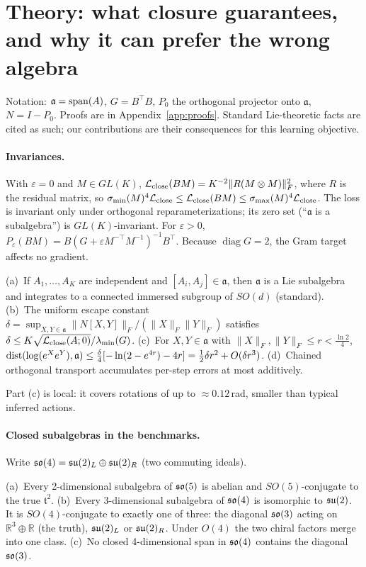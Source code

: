 \section{Theory: what closure guarantees, and why it can prefer the wrong algebra}\label{sec:theory}
Notation: $\mathfrak a=\operatorname{span}(A)$, $G=B^\top B$, $P_0$ the orthogonal projector onto $\mathfrak a$, $N=I-P_0$.
Proofs are in Appendix~\ref{app:proofs}. Standard Lie-theoretic facts are cited as such; our contributions are
their consequences for this learning objective.

\paragraph{Invariances.}
With $\varepsilon{=}0$ and $M\in GL(K)$, $\mathcal{L}_{\mathrm{close}}(BM)=K^{-2}\|R(M\otimes M)\|_F^2$, where $R$ is the residual matrix,
so $\sigma_{\min}(M)^4\mathcal{L}_{\mathrm{close}}\le\mathcal{L}_{\mathrm{close}}(BM)\le\sigma_{\max}(M)^4\mathcal{L}_{\mathrm{close}}$. The loss is invariant only under orthogonal
reparameterizations; its zero set (``$\mathfrak a$ is a subalgebra'') is $GL(K)$-invariant. For $\varepsilon>0$,
$P_\varepsilon(BM)=B(G+\varepsilon M^{-\top}M^{-1})^{-1}B^\top$. Because $\operatorname{diag}G=2$, the Gram target
affects no gradient.

\begin{proposition}\label{prop:basic}
(a)~If $A_1,\dots,A_K$ are independent and $[A_i,A_j]\in\mathfrak a$, then $\mathfrak a$ is a Lie subalgebra and
integrates to a connected immersed subgroup of $SO(d)$ (standard).
(b)~The uniform escape constant
$\delta=\sup_{X,Y\in\mathfrak a}\|N[X,Y]\|_F/(\|X\|_F\|Y\|_F)$ satisfies
$\delta\le K\sqrt{\mathcal{L}_{\mathrm{close}}(A;0)}/\lambda_{\min}(G)$.
(c)~For $X,Y\in\mathfrak a$ with $\|X\|_F,\|Y\|_F\le r<\frac{\ln2}{4}$,
$\operatorname{dist}(\log(e^Xe^Y),\mathfrak a)\le\frac{\delta}{4}[-\ln(2-e^{4r})-4r]=\tfrac12\delta r^2+O(\delta r^3)$.
(d)~Chained orthogonal transport accumulates per-step errors at most additively.
\end{proposition}

Part (c) is local: it covers rotations of up to $\approx0.12$\,rad, smaller than typical inferred actions.

\paragraph{Closed subalgebras in the benchmarks.}
Write $\mathfrak{so}(4)=\mathfrak{su}(2)_L\oplus\mathfrak{su}(2)_R$ (two commuting ideals).

\begin{proposition}\label{prop:classify}
(a)~Every 2-dimensional subalgebra of $\mathfrak{so}(5)$ is abelian and $SO(5)$-conjugate to the true $\mathfrak t^2$.
(b)~Every 3-dimensional subalgebra of $\mathfrak{so}(4)$ is isomorphic to $\mathfrak{su}(2)$. It is $SO(4)$-conjugate to exactly one
of three: the diagonal $\mathfrak{so}(3)$ acting on $\mathbb R^3\oplus\mathbb R$ (the truth), $\mathfrak{su}(2)_L$ or $\mathfrak{su}(2)_R$.
Under $O(4)$ the two chiral factors merge into one class.
(c)~No closed 4-dimensional span in $\mathfrak{so}(4)$ contains the diagonal $\mathfrak{so}(3)$.
\end{proposition}

